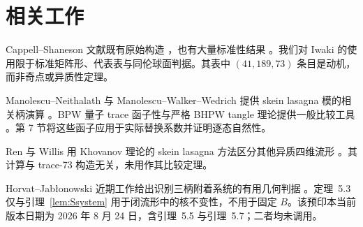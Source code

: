 \section{相关工作}

Cappell--Shaneson 文献既有原始构造 \cite{CappellShaneson1976,AitchisonRubinstein1984}，也有大量标准性结果 \cite{Akbulut2010,Gompf2010,KimYamada2017,Iwaki2024}。我们对 Iwaki 的使用限于标准矩阵形、代表表与同伦球面判据。其表中 $(41,189,73)$ 条目是动机，而非奇点或异质性定理。

Manolescu--Neithalath 与 Manolescu--Walker--Wedrich 提供 skein lasagna 模的相关柄演算 \cite{ManolescuNeithalath2020,ManolescuWalkerWedrich2023}。BPW 量子 trace 函子性与严格 BHPW tangle 理论提供一般比较工具 \cite{BeliakovaPutyraWehrli2019,BeliakovaHogancampPutyraWehrli2023}。第 7 节将这些函子应用于实际替换系数并证明逐态自然性。

Ren 与 Willis 用 Khovanov 理论的 skein lasagna 方法区分其他异质四维流形 \cite{RenWillis2024}。其计算与 trace-73 构造无关，未用作其比较定理。

Horvat--Jab\l{}onowski 近期工作给出识别三柄附着系统的有用几何判据 \cite{HorvatJablonowski2025}。定理~5.3 仅与引理~\ref{lem:Ssystem} 用于闭流形中的核不变性，不用于固定 $B$。该预印本当前版本日期为 2026 年 8 月 24 日，含引理~5.5 与引理~5.7；二者均未调用。
